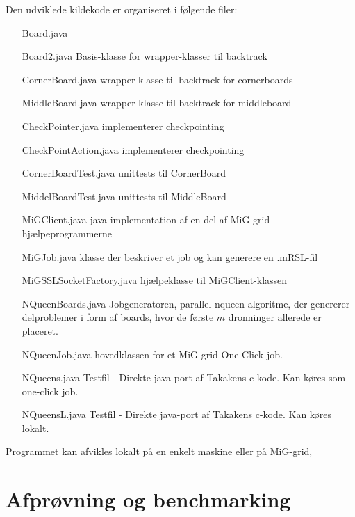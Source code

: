 \documentclass[final,a4paper,10pt]{article}
\newcommand{\mig}{MiG}
\newcommand{\oc}{One-Click}
\begin{document}
Den udviklede kildekode er organiseret i følgende filer:
\begin{itemize}
	\item[Board.java] 
	\item[Board2.java] Basis-klasse for wrapper-klasser til backtrack
	\item[CornerBoard.java] wrapper-klasse til backtrack for cornerboards
	\item[MiddleBoard.java] wrapper-klasse til backtrack for middleboard
	\item[CheckPointer.java] implementerer checkpointing
	\item[CheckPointAction.java] implementerer checkpointing
	\item[CornerBoardTest.java] unittests til CornerBoard
	\item[MiddelBoardTest.java] unittests til MiddleBoard
	\item[MiGClient.java] java-implementation af en del af \mig-grid-hjælpeprogrammerne
	\item[MiGJob.java] klasse der beskriver et job og kan generere en .mRSL-fil
	\item[MiGSSLSocketFactory.java] hjælpeklasse til MiGClient-klassen
	\item[NQueenBoards.java] Jobgeneratoren, parallel-nqueen-algoritme, der genererer delproblemer i form af boards, hvor de første $m$ dronninger allerede er placeret. 
	\item[NQueenJob.java] hovedklassen for et \mig-grid-\oc-job. 
	\item[NQueens.java] Testfil - Direkte java-port af Takakens c-kode. Kan køres som one-click job.
	\item[NQueensL.java] Testfil - Direkte java-port af Takakens c-kode. Kan køres lokalt.
\end{itemize}

Programmet kan afvikles lokalt på en enkelt maskine eller på \mig-grid,  



\section{Afprøvning og benchmarking}
\end{document}
